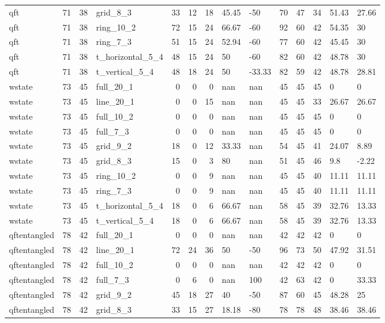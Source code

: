 \begin{longtable}{lrrlrrrllrrrll}
qft & 71 & 38 & grid\_8\_3 & 33 & 12 & 18 & 45.45 & -50 & 70 & 47 & 34 & 51.43 & 27.66 \\
qft & 71 & 38 & ring\_10\_2 & 72 & 15 & 24 & 66.67 & -60 & 92 & 60 & 42 & 54.35 & 30 \\
qft & 71 & 38 & ring\_7\_3 & 51 & 15 & 24 & 52.94 & -60 & 77 & 60 & 42 & 45.45 & 30 \\
qft & 71 & 38 & t\_horizontal\_5\_4 & 48 & 15 & 24 & 50 & -60 & 82 & 60 & 42 & 48.78 & 30 \\
qft & 71 & 38 & t\_vertical\_5\_4 & 48 & 18 & 24 & 50 & -33.33 & 82 & 59 & 42 & 48.78 & 28.81 \\
wstate & 73 & 45 & full\_20\_1 & 0 & 0 & 0 & nan & nan & 45 & 45 & 45 & 0 & 0 \\
wstate & 73 & 45 & line\_20\_1 & 0 & 0 & 15 & nan & nan & 45 & 45 & 33 & 26.67 & 26.67 \\
wstate & 73 & 45 & full\_10\_2 & 0 & 0 & 0 & nan & nan & 45 & 45 & 45 & 0 & 0 \\
wstate & 73 & 45 & full\_7\_3 & 0 & 0 & 0 & nan & nan & 45 & 45 & 45 & 0 & 0 \\
wstate & 73 & 45 & grid\_9\_2 & 18 & 0 & 12 & 33.33 & nan & 54 & 45 & 41 & 24.07 & 8.89 \\
wstate & 73 & 45 & grid\_8\_3 & 15 & 0 & 3 & 80 & nan & 51 & 45 & 46 & 9.8 & -2.22 \\
wstate & 73 & 45 & ring\_10\_2 & 0 & 0 & 9 & nan & nan & 45 & 45 & 40 & 11.11 & 11.11 \\
wstate & 73 & 45 & ring\_7\_3 & 0 & 0 & 9 & nan & nan & 45 & 45 & 40 & 11.11 & 11.11 \\
wstate & 73 & 45 & t\_horizontal\_5\_4 & 18 & 0 & 6 & 66.67 & nan & 58 & 45 & 39 & 32.76 & 13.33 \\
wstate & 73 & 45 & t\_vertical\_5\_4 & 18 & 0 & 6 & 66.67 & nan & 58 & 45 & 39 & 32.76 & 13.33 \\
qftentangled & 78 & 42 & full\_20\_1 & 0 & 0 & 0 & nan & nan & 42 & 42 & 42 & 0 & 0 \\
qftentangled & 78 & 42 & line\_20\_1 & 72 & 24 & 36 & 50 & -50 & 96 & 73 & 50 & 47.92 & 31.51 \\
qftentangled & 78 & 42 & full\_10\_2 & 0 & 0 & 0 & nan & nan & 42 & 42 & 42 & 0 & 0 \\
qftentangled & 78 & 42 & full\_7\_3 & 0 & 6 & 0 & nan & 100 & 42 & 63 & 42 & 0 & 33.33 \\
qftentangled & 78 & 42 & grid\_9\_2 & 45 & 18 & 27 & 40 & -50 & 87 & 60 & 45 & 48.28 & 25 \\
qftentangled & 78 & 42 & grid\_8\_3 & 33 & 15 & 27 & 18.18 & -80 & 78 & 78 & 48 & 38.46 & 38.46 \\

\end{longtable}

